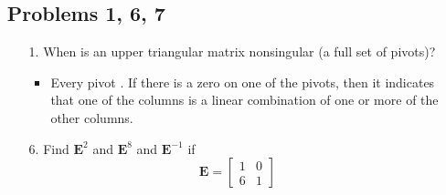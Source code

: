 \begin{itemize}
  \item []

    \subsection{Problems 1, 6, 7}
    \begin{itemize}\color{foreground-2}
      \item[1.] When is an upper triangular matrix nonsingular (a full set of
        pivots)?

      \begin{itemize}\color{foreground}
         \item Every pivot . If there is a zero on one of
           the pivots, then it indicates that one of the columns is a linear
           combination of one or more of the other columns.
      \end{itemize}

      \item[6.] Find \( \bm{E}^2 \) and \( \bm{E}^8 \) and \( \bm{E}^{-1} \) if
      \[%
      \bm{E} = \begin{bmatrix}
        1 & 0 \\
        6 & 1
      \end{bmatrix}
      \]%
      \fg{\[%
          \bm{E}^2 = \begin{bmatrix}
            1 & 0 \\
            36 & 1
          \end{bmatrix}\quad
          \bm{E}^8 =
          \begin{bmatrix}
            1 & 0 \\
            1679616 & 1
          \end{bmatrix}\quad
          \bm{E}^{-1} =
          \begin{bmatrix}
            1 & 0 \\
            -6 & 1
          \end{bmatrix}
      \]}%


\end{itemize}
\end{itemize}
